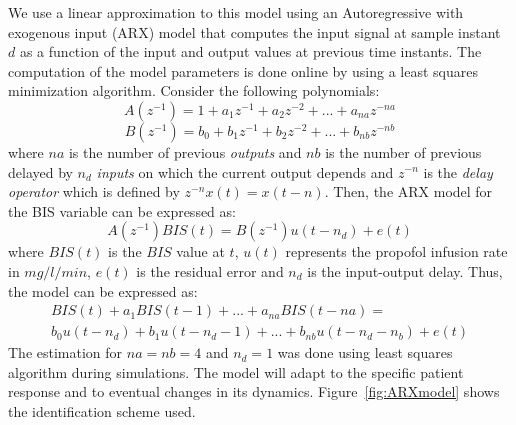 We use a linear approximation to this model using an Autoregressive
with exogenous input (ARX) model that computes the input signal at
sample instant $d$ as a function of the input and output values at
previous time instants. The computation of the model parameters is
done online by using a least squares minimization algorithm.
%
%
Consider the following polynomials:
\[
A(z^{-1})=1+a_{1}z^{-1}+a_{2}z^{-2}+...+a_{na}z^{-na}
\]
\[
B(z^{-1})=b_{0}+b_{1}z^{-1}+b_{2}z^{-2}+...+b_{nb}z^{-nb}
\]
\noindent
where ${na}$ is the number of previous \emph{outputs} and ${nb}$ is the
number of previous delayed by $n_{d}$ \emph{inputs} on which the
current output depends and $z^{-n}$ is the \emph{delay operator}
which is defined by $z^{-n}x(t)=x(t-n)$.  Then, the ARX model for the
BIS variable can be expressed as:
\[
A(z^{-1})BIS(t)=B(z^{-1})u(t-n_{d})+e(t)
\]
\noindent
where $BIS(t)$ is the $BIS$ value at $t$, $u(t)$ represents the propofol infusion rate in $mg/l/min$, $e(t)$ is the residual
error and $n_{d}$ is the input-output delay.
Thus, the model can be expressed as:
\begin{multline}
BIS(t)+ a_{1} BIS(t-1)+...+ a_{na} BIS(t-na) = \\
b_{0}u(t-n_{d})+ b_{1}u(t-n_{d}-1)+...+ b_{nb} u(t-n_{d}- n_{b})+e(t)
\end{multline}
%
The estimation for $na=nb=4$ and $n_{d}=1$ was done using least squares algorithm during simulations.
%
%
The model will adapt to the specific patient response and to eventual changes in its dynamics.
%
Figure~\ref{fig:ARXmodel} shows the identification scheme used.

